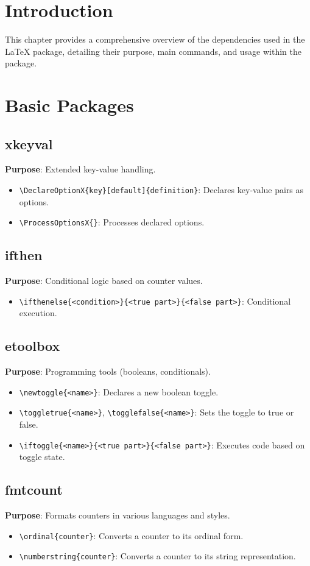 \documentclass[12pt,twoside]{report}
\begin{document}
\section{Introduction}
This chapter provides a comprehensive overview of the dependencies used in the LaTeX package, detailing their purpose, main commands, and usage within the package.

\section{Basic Packages}
\subsection{xkeyval}
\textbf{Purpose}: Extended key-value handling.
\begin{itemize}
    \item \verb|\DeclareOptionX{key}[default]{definition}|: Declares key-value pairs as options.
    \item \verb|\ProcessOptionsX{}|: Processes declared options.
\end{itemize}

\subsection{ifthen}
\textbf{Purpose}: Conditional logic based on counter values.
\begin{itemize}
    \item \verb|\ifthenelse{<condition>}{<true part>}{<false part>}|: Conditional execution.
\end{itemize}

\subsection{etoolbox}
\textbf{Purpose}: Programming tools (booleans, conditionals).
\begin{itemize}
    \item \verb|\newtoggle{<name>}|: Declares a new boolean toggle.
    \item \verb|\toggletrue{<name>}|, \verb|\togglefalse{<name>}|: Sets the toggle to true or false.
    \item \verb|\iftoggle{<name>}{<true part>}{<false part>}|: Executes code based on toggle state.
\end{itemize}

\subsection{fmtcount}
\textbf{Purpose}: Formats counters in various languages and styles.
\begin{itemize}
    \item \verb|\ordinal{counter}|: Converts a counter to its ordinal form.
    \item \verb|\numberstring{counter}|: Converts a counter to its string representation.
\end{itemize}
\end{document}
